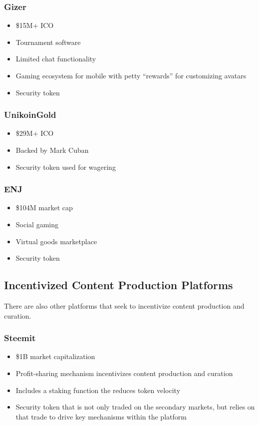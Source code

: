 \documentclass[11pt]{report}
\begin{document}
\subsubsection{Gizer\cite{gizer}}
\begin{itemize}
\item \$15M+ ICO
\item Tournament software
\item Limited chat functionality
\item Gaming ecosystem for mobile with petty ``rewards'' for customizing avatars
\item Security token
\end{itemize}
\subsubsection{UnikoinGold\cite{unikoingold}}
\begin{itemize}
\item \$29M+ ICO
\item Backed by Mark Cuban
\item Security token used for wagering
\end{itemize}
\subsubsection{ENJ\cite{enj}}
\begin{itemize}
\item \$104M market cap
\item Social gaming
\item Virtual goods marketplace
\item Security token
\end{itemize}
\subsection{Incentivized Content Production Platforms}
There are also other platforms that seek to incentivize content production and curation.
\subsubsection{Steemit\cite{steemit}}
\begin{itemize}
\item \$1B market capitalization
\item Profit-sharing mechanism incentivizes content production and curation
\item Includes a staking function the reduces token velocity
\item Security token that is not only traded on the secondary markets, but relies on that trade to drive key mechanisms within the platform
\end{itemize}
\end{document}
